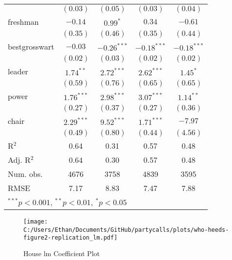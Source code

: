 \documentclass[12pt]{article}
\begin{document}
\begin{table}[ht]
\begin{center}
\begin{tabular}{l c c c c }
			& $(0.03)$      & $(0.05)$      & $(0.03)$      & $(0.04)$      \\
			freshman               & $-0.14$       & $0.99^{*}$    & $0.34$        & $-0.61$       \\
			& $(0.35)$      & $(0.46)$      & $(0.35)$      & $(0.44)$      \\
			bestgrosswart          & $-0.03$       & $-0.26^{***}$ & $-0.18^{***}$ & $-0.18^{***}$ \\
			& $(0.02)$      & $(0.03)$      & $(0.02)$      & $(0.02)$      \\
			leader                 & $1.74^{**}$   & $2.72^{***}$  & $2.62^{***}$  & $1.45^{*}$    \\
			& $(0.59)$      & $(0.76)$      & $(0.65)$      & $(0.65)$      \\
			power                  & $1.76^{***}$  & $2.98^{***}$  & $3.07^{***}$  & $1.14^{**}$   \\
			& $(0.27)$      & $(0.37)$      & $(0.27)$      & $(0.36)$      \\
			chair                  & $2.29^{***}$  & $9.52^{***}$  & $1.71^{***}$  & $-7.97$       \\
			& $(0.49)$      & $(0.80)$      & $(0.44)$      & $(4.56)$      \\
			\hline
			R$^2$                  & 0.64          & 0.31          & 0.57          & 0.48          \\
			Adj. R$^2$             & 0.64          & 0.30          & 0.57          & 0.48          \\
			Num. obs.              & 4676          & 3758          & 4839          & 3595          \\
			RMSE                   & 7.17          & 8.83          & 7.47          & 7.88          \\
			\hline
			\multicolumn{5}{l}{\scriptsize{$^{***}p<0.001$, $^{**}p<0.01$, $^*p<0.05$}}
		\end{tabular}
	\end{center}
\end{table}

\begin{figure}[h]
	\centering
	\caption{House lm Coefficient Plot}
	\texttt{[image: C:/Users/Ethan/Documents/GitHub/partycalls/plots/who-heeds-figure2-replication\_lm.pdf]}
\end{figure}
\end{document}
